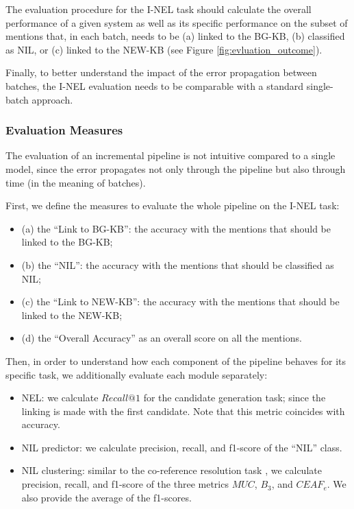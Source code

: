 The evaluation procedure for the I-NEL task should calculate the overall performance of a given system as well as 
its specific performance on the subset of mentions that, in each batch, needs to be (a) linked to the BG-KB, (b) classified as NIL, or (c) linked to the NEW-KB (see Figure \ref{fig:evluation_outcome}).

Finally, to better understand the impact of the error propagation between batches, the I-NEL evaluation needs to be comparable with a standard single-batch approach.

\subsubsection{Evaluation Measures} \label{sec:evaluation2}
The evaluation of an incremental pipeline is not intuitive compared to a single model, since the error propagates not only through the pipeline but also through time (in the meaning of batches).

First, we define the measures to evaluate the whole pipeline on the I-NEL task:
\begin{itemize}
    \item (a) the ``Link to BG-KB'': the accuracy with the mentions that should be linked to the BG-KB;
    \item (b) the ``NIL'': the accuracy with the mentions that should be classified as NIL;
    \item (c) the ``Link to NEW-KB'': the accuracy with the mentions that should be linked to the NEW-KB;
    \item (d) the ``Overall Accuracy'' as an overall score on all the mentions.
\end{itemize}

Then, in order to understand how each component of the pipeline behaves for its specific task, we additionally evaluate each module separately:
\begin{itemize}
    \item NEL: we calculate $Recall@1$ for the candidate generation task; since the linking is made with the first candidate. Note that this metric coincides with accuracy.
    \item NIL predictor: we calculate precision, recall, and f1-score of the ``NIL'' class.
    \item NIL clustering: similar to the co-reference resolution task \cite{streaming_crossdoc_coreference}, we calculate precision, recall, and f1-score of the three metrics $MUC$, $B_3$, and $CEAF_e$. We also provide the average of the f1-scores.
\end{itemize}

